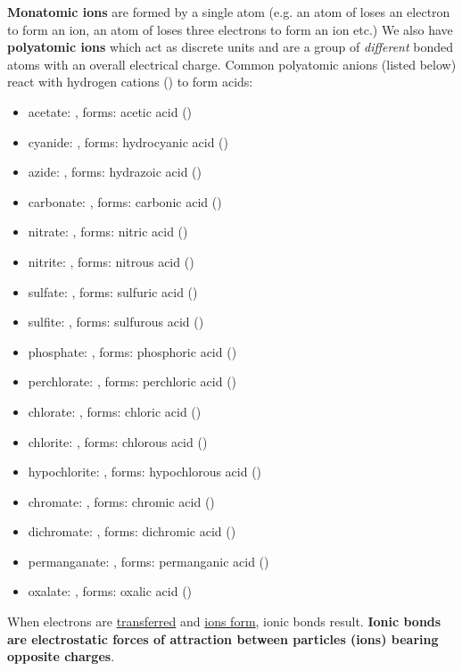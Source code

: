 \documentclass{article}
\begin{document}
\textbf{Monatomic ions} are formed by a single atom (e.g. an atom of  loses an electron to form an  ion, an atom of  loses three electrons to form an  ion etc.) We also have \textbf{polyatomic ions} which act as discrete units and are a group of \emph{different} bonded atoms with an overall electrical charge. Common polyatomic anions (listed below) react with hydrogen cations () to form acids:
\begin{itemize}\label{polyatomic ions}
    \item acetate: , forms: acetic acid ()
    \item cyanide: , forms: hydrocyanic acid ()
    \item azide: , forms: hydrazoic acid ()
    \item carbonate: , forms: carbonic acid ()
    \item nitrate: , forms: nitric acid ()
    \item nitrite: , forms: nitrous acid ()
    \item sulfate: , forms: sulfuric acid ()
    \item sulfite: , forms: sulfurous acid ()
    \item phosphate: , forms: phosphoric acid ()
    \item perchlorate: , forms: perchloric acid ()
    \item chlorate: , forms: chloric acid ()
    \item chlorite: , forms: chlorous acid ()
    \item hypochlorite: , forms: hypochlorous acid ()
    \item chromate: , forms: chromic acid ()
    \item dichromate: , forms: dichromic acid ()
    \item permanganate: , forms: permanganic acid ()
    \item oxalate: , forms: oxalic acid ()
\end{itemize}

When electrons are \underline{transferred} and \underline{ions form}, ionic bonds result. \textbf{Ionic bonds are electrostatic forces of attraction between particles (ions) bearing opposite charges}.
\end{document}
